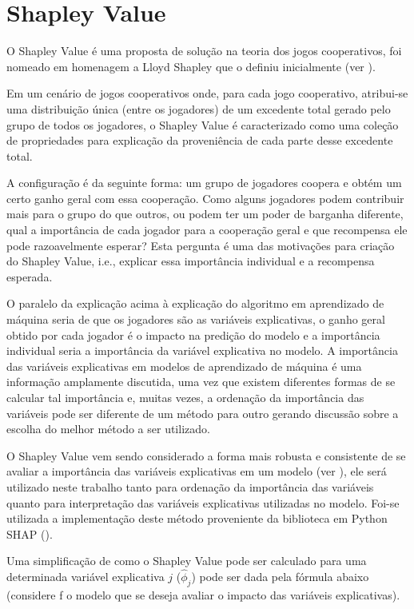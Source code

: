 \section{Shapley Value}
\label{sec:shapley_value}

O Shapley Value é uma proposta de solução na teoria dos jogos cooperativos, foi nomeado em homenagem a Lloyd Shapley que o definiu inicialmente (ver \citet{Shapley1953}).

Em um cenário de jogos cooperativos onde, para cada jogo cooperativo, atribui-se uma distribuição única (entre os jogadores) de um excedente total gerado pelo grupo de todos os jogadores, o Shapley Value é caracterizado como uma coleção de propriedades para explicação da proveniência de cada parte desse excedente total.

A configuração é da seguinte forma: um grupo de jogadores coopera e obtém um certo ganho geral com essa cooperação. Como alguns jogadores podem contribuir mais para o grupo do que outros, ou podem ter um poder de barganha diferente, qual a importância de cada jogador para a cooperação geral e que recompensa ele pode razoavelmente esperar? Esta pergunta é uma das motivações para criação do Shapley Value, i.e., explicar essa importância individual e a recompensa esperada.

O paralelo da explicação acima à explicação do algoritmo em aprendizado de máquina seria de que os jogadores são as variáveis explicativas, o ganho geral obtido por cada jogador é o impacto na predição do modelo e a importância individual seria a importância da variável explicativa no modelo. A importância das variáveis explicativas em modelos de aprendizado de máquina é uma informação amplamente discutida, uma vez que existem diferentes formas de se calcular tal importância e, muitas vezes, a ordenação da importância das variáveis pode ser diferente de um método para outro gerando discussão sobre a escolha do melhor método a ser utilizado.

O Shapley Value vem sendo considerado a forma mais robusta e consistente de se avaliar a importância das variáveis explicativas em um modelo (ver \citet{Lundberg2017}), ele será utilizado neste trabalho tanto para ordenação da importância das variáveis quanto para interpretação das variáveis explicativas utilizadas no modelo. Foi-se utilizada a implementação deste método proveniente da biblioteca em Python SHAP (\citet{Shap}).

Uma simplificação de como o Shapley Value pode ser calculado para uma determinada variável explicativa $j$ ($ \hat{\phi}_j $) pode ser dada pela fórmula abaixo (considere f o modelo que se deseja avaliar o impacto das variáveis explicativas).

